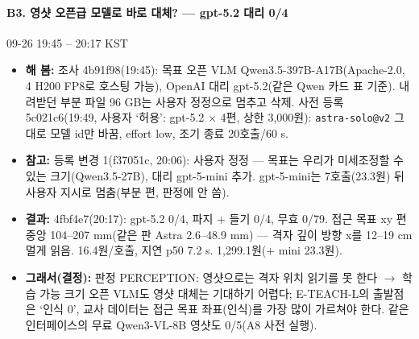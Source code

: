\paragraph{B3. 영샷 오픈급 모델로 바로 대체? --- gpt-5.2 대리 0/4}
{\small 09-26 19:45 -- 20:17 KST}
\begin{itemize}
  \item \textbf{해 봄:} 조사 4b91f98(19:45): 목표 오픈 VLM Qwen3.5-397B-A17B(Apache-2.0, 4 H200 FP8로 호스팅 가능), OpenAI 대리 gpt-5.2(같은 Qwen 카드 표 기준). 내려받던 부분 파일 96 GB는 사용자 정정으로 멈추고 삭제. 사전 등록 5c021c6(19:49, 사용자 `허용': gpt-5.2 $\times$ 4편, 상한 3,000원): \texttt{astra-\allowbreak{}solo@v2} 그대로 모델 id만 바꿈, effort low, 조기 종료 20호출/60 s.
  \item \textbf{참고:} 등록 변경 1(f37051c, 20:06): 사용자 정정 --- 목표는 우리가 미세조정할 수 있는 크기(Qwen3.5-27B), 대리 gpt-5-mini 추가. gpt-5-mini는 7호출(23.3원) 뒤 사용자 지시로 멈춤(부분 편, 판정에 안 씀).
  \item \textbf{결과:} 4fbf4e7(20:17): gpt-5.2 0/4, 파지 + 들기 0/4, 무효 0/79. 접근 목표 xy 편 중앙 104--207 mm(같은 판 Astra 2.6--48.9 mm) --- 격자 깊이 방향 x를 12--19 cm 멀게 읽음. 16.4원/호출, 지연 p50 7.2 s. 1,299.1원(+ mini 23.3원).
  \item \textbf{그래서(결정):} 판정 PERCEPTION: 영샷으로는 격자 위치 읽기를 못 한다 $\rightarrow$ 학습 가능 크기 오픈 VLM도 영샷 대체는 기대하기 어렵다; E-TEACH-L의 출발점은 `인식 0', 교사 데이터는 접근 목표 좌표(인식)를 가장 많이 가르쳐야 한다. 같은 인터페이스의 무료 Qwen3-VL-8B 영샷도 0/5(A8 사전 실행).
\end{itemize}

